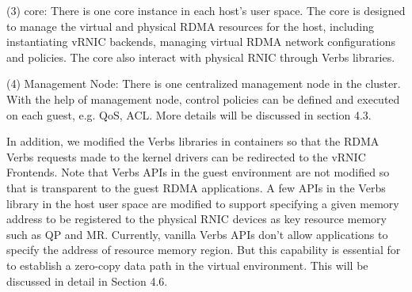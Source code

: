 (3) \sys core: There is one \sys core instance in each host's user space. The \sys core is designed to manage the virtual and physical RDMA resources for the host, including instantiating vRNIC backends, managing virtual RDMA network configurations and policies. The \sys core also interact with physical RNIC through Verbs libraries.


(4) Management Node: There is one centralized management node in the cluster. With the help of management node, control policies can be defined and executed on each guest, e.g. QoS, ACL. More details will be discussed in section 4.3.


In addition,  we modified the Verbs libraries in containers so that the RDMA Verbs requests made to the kernel drivers can be redirected to the vRNIC Frontends. Note that Verbs APIs in the guest environment are not modified so that \sys is transparent to the guest RDMA applications. A few APIs in the Verbs library in the host user space are modified to support specifying a given memory address to be registered to the physical RNIC devices as key resource memory such as QP and MR. Currently, vanilla Verbs APIs don't allow applications to specify the address of resource memory region. But this capability is essential for \sys to establish a zero-copy data path in the virtual environment. This will be discussed in detail in Section 4.6.